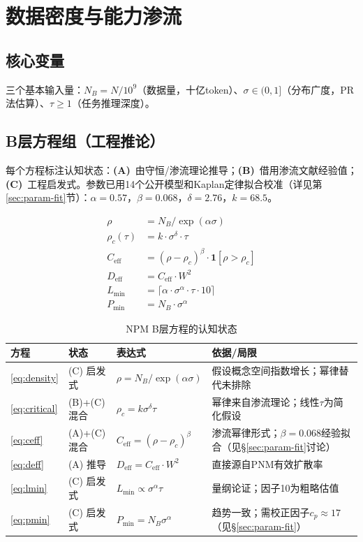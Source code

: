 \documentclass[11pt,a4paper]{article}
\newcommand{\Ceff}{C_{\text{eff}}}
\newcommand{\Deff}{D_{\text{eff}}}
\newcommand{\rhoc}{\rho_c}
\begin{document}
\section{数据密度与能力渗流}

\subsection{核心变量}
三个基本输入量：$N_B=N/10^9$（数据量，十亿token）、$\sigma\in(0,1]$（分布广度，PR法估算）、$\tau\geq1$（任务推理深度）。

\subsection{B层方程组（工程推论）}
\label{sec:blayer}

每个方程标注认知状态：\textbf{(A)}~由守恒/渗流理论推导；\textbf{(B)}~借用渗流文献经验值；\textbf{(C)}~工程启发式。参数已用14个公开模型和Kaplan定律拟合校准（详见第\ref{sec:param-fit}节）：$\alpha=0.57$，$\beta=0.068$，$\delta=2.76$，$k=68.5$。

\begin{align}
  \rho &= N_B/\exp(\alpha\sigma) \label{eq:density} \\
  \rhoc(\tau) &= k\cdot\sigma^\delta\cdot\tau \label{eq:critical} \\
  \Ceff &= (\rho-\rhoc)^\beta\cdot\mathbf{1}[\rho>\rhoc] \label{eq:ceff} \\
  \Deff &= \Ceff\cdot W^2 \label{eq:deff} \\
  L_{\min} &= \lceil\alpha\cdot\sigma^\alpha\cdot\tau\cdot10\rceil \label{eq:lmin} \\
  P_{\min} &= N_B\cdot\sigma^\alpha \label{eq:pmin}
\end{align}

\begin{table}[H]
\centering
\caption{NPM B层方程的认知状态}
\label{tab:eq_sources}
\small
\begin{tabular}{llp{2.8cm}p{5cm}}
\toprule
\textbf{方程} & \textbf{状态} & \textbf{表达式} & \textbf{依据/局限} \\
\midrule
\eqref{eq:density}  & (C) 启发式 & $\rho=N_B/\exp(\alpha\sigma)$ & 假设概念空间指数增长；幂律替代未排除 \\
\eqref{eq:critical} & (B)+(C) 混合 & $\rhoc=k\sigma^\delta\tau$ & 幂律来自渗流理论；线性$\tau$为简化假设 \\
\eqref{eq:ceff}     & (A)+(C) 混合 & $\Ceff=(\rho{-}\rhoc)^\beta$ & 渗流幂律形式；$\beta=0.068$经验拟合（见\S\ref{sec:param-fit}讨论） \\
\eqref{eq:deff}     & (A) 推导   & $\Deff=\Ceff\cdot W^2$ & 直接源自PNM有效扩散率 \\
\eqref{eq:lmin}     & (C) 启发式 & $L_{\min}\propto\sigma^\alpha\tau$ & 量纲论证；因子10为粗略估值 \\
\eqref{eq:pmin}     & (C) 启发式 & $P_{\min}=N_B\sigma^\alpha$ & 趋势一致；需校正因子$c_p\approx17$（见\S\ref{sec:param-fit}） \\
\bottomrule
\end{tabular}
\end{table}
\end{document}
